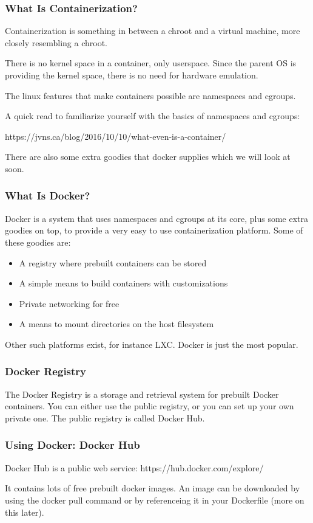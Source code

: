 \documentclass[helvetica,english,utf8,notitle,nologo]{beamer}
\begin{document}
\begin{frame}
  \frametitle{What Is Containerization?}

  Containerization is something in between a chroot and a virtual
  machine, more closely resembling a chroot.

  There is no kernel space in a container, only userspace. Since the
  parent OS is providing the kernel space, there is no need for
  hardware emulation.

  The linux features that make containers possible are namespaces and
  cgroups.

  A quick read to familiarize yourself with the basics of namespaces
  and cgroups:

  https://jvns.ca/blog/2016/10/10/what-even-is-a-container/

  There are also some extra goodies that docker supplies which we will
  look at soon.
\end{frame}

\begin{frame}
  \frametitle{What Is Docker?}

  Docker is a system that uses namespaces and cgroups at its core,
  plus some extra goodies on top, to provide a very easy to use
  containerization platform. Some of these goodies are:

  \begin{itemize}
  \item A registry where prebuilt containers can be stored
  \item A simple means to build containers with customizations
  \item Private networking for free
  \item A means to mount directories on the host filesystem
  \end{itemize}

  Other such platforms exist, for instance LXC. Docker is just the
  most popular.
\end{frame}

\begin{frame}
  \frametitle{Docker Registry}

  The Docker Registry is a storage and retrieval system for prebuilt
  Docker containers. You can either use the public registry, or you
  can set up your own private one. The public registry is called
  Docker Hub.
\end{frame}

\begin{frame}
  \frametitle{Using Docker: Docker Hub}

  Docker Hub is a public web service: https://hub.docker.com/explore/

  It contains lots of free prebuilt docker images. An image can be
  downloaded by using the docker pull command or by referenceing it in
  your Dockerfile (more on this later).
\end{frame}
\end{document}
